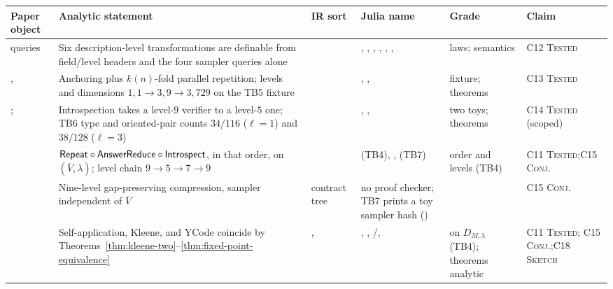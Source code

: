 \scriptsize
\begin{longtable}{P{0.21\textwidth}P{0.16\textwidth}P{0.19\textwidth}P{0.19\textwidth}P{0.12\textwidth}P{0.08\textwidth}}
\toprule
Paper object & Analytic statement & IR sort & Julia name & Grade & Claim \\
\midrule
\endhead
{} queries\newline{}
& Six description-level transformations are definable from field/level headers
and the four sampler queries alone & 
& , , , ,
, , 
&  laws; semantics  & C12 \textsc{Tested} \\
, \newline{}
& Anchoring plus \(k(n)\)-fold parallel repetition; levels and dimensions
\(1,1\to3,9\to3,729\) on the TB5 fixture & 
& , , 
&  fixture; theorems  & C13 \textsc{Tested} \\
\newline{}; \newline{}
& Introspection takes a level-\(9\) verifier to a level-\(5\) one; TB6 type and
oriented-pair counts \(34/116\) (\(\ell=1\)) and \(38/128\) (\(\ell=3\))
&  & , ,
 &  two toys; theorems 
& C14 \textsc{Tested} (scoped) \\
\newline{}
& \(\mathsf{Repeat}\circ\mathsf{AnswerReduce}\circ\mathsf{Introspect}\), in that order, on
\((\overline V,\lambda)\); level chain \(9\to5\to7\to9\) &
\newline{} &  (TB4),
,  (TB7) &  order and
levels (TB4) & C11 \textsc{Tested};\newline C15 \textsc{Conj.} \\
\newline{}
& Nine-level gap-preserving compression, sampler independent of \(\overline V\)
& contract tree
& no proof checker; TB7 prints a toy sampler hash ()
&  & C15 \textsc{Conj.} \\
\newline{}
& Self-application, Kleene, and YCode coincide by
Theorems~\ref{thm:kleene-two}--\ref{thm:fixed-point-equivalence} &
,  & , ,
/,  &  on
\(D_{M,\lambda}\) (TB4); theorems analytic & C11 \textsc{Tested};\newline
C15 \textsc{Conj.};\newline C18 \textsc{Sketch} \\
\bottomrule
\end{longtable}
